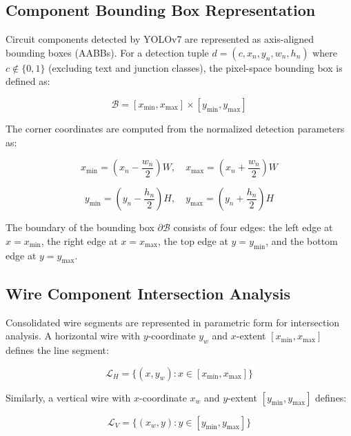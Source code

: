 \subsection{Component Bounding Box Representation}

Circuit components detected by YOLOv7 are represented as axis-aligned bounding boxes (AABBs). For a detection tuple $d = (c, x_n, y_n, w_n, h_n)$ where $c \notin \{0, 1\}$ (excluding text and junction classes), the pixel-space bounding box is defined as:

\begin{equation}
\mathcal{B} = [x_{\min}, x_{\max}] \times [y_{\min}, y_{\max}]
\label{eq:bounding-box}
\end{equation}

The corner coordinates are computed from the normalized detection parameters as:

\begin{equation}
x_{\min} = \left(x_n - \frac{w_n}{2}\right) W, \quad x_{\max} = \left(x_n + \frac{w_n}{2}\right) W
\end{equation}

\begin{equation}
y_{\min} = \left(y_n - \frac{h_n}{2}\right) H, \quad y_{\max} = \left(y_n + \frac{h_n}{2}\right) H
\label{eq:box-corners}
\end{equation}

The boundary of the bounding box $\partial \mathcal{B}$ consists of four edges: the left edge at $x = x_{\min}$, the right edge at $x = x_{\max}$, the top edge at $y = y_{\min}$, and the bottom edge at $y = y_{\max}$.

\subsection{Wire Component Intersection Analysis}

Consolidated wire segments are represented in parametric form for intersection analysis. A horizontal wire with $y$-coordinate $y_w$ and $x$-extent $[x_{\min}, x_{\max}]$ defines the line segment:

\begin{equation}
\mathcal{L}_H = \{(x, y_w) : x \in [x_{\min}, x_{\max}]\}
\label{eq:horizontal-wire}
\end{equation}

Similarly, a vertical wire with $x$-coordinate $x_w$ and $y$-extent $[y_{\min}, y_{\max}]$ defines:

\begin{equation}
\mathcal{L}_V = \{(x_w, y) : y \in [y_{\min}, y_{\max}]\}
\label{eq:vertical-wire}
\end{equation}

